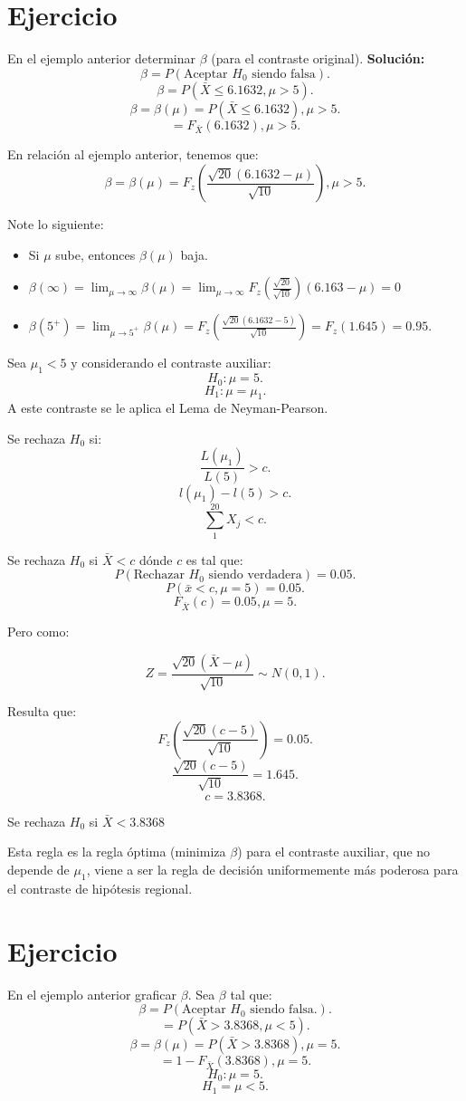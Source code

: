 \documentclass{article}
\begin{document}
\section{Ejercicio}

En el ejemplo anterior determinar $\beta$ (para el contraste original). \textbf{Solución:}
\[\beta=P(\text{Aceptar $H_{0}$ siendo falsa}).\]
\[\beta=P(\bar{X}\leq 6.1632, \mu > 5).\]
\[\beta=\beta(\mu)=P(\bar{X} \leq 6.1632), \mu>5.\]
\[=F_{\bar{X}}(6.1632),\mu>5.\]

En relación al ejemplo anterior, tenemos que:
\[\beta=\beta(\mu)=F_{z}(\frac{\sqrt{20}(6.1632-\mu)}{\sqrt{10}}),\mu>5.\]

Note lo siguiente:

\begin{itemize}
	\item Si $\mu$ sube, entonces $\beta(\mu)$ baja.
	\item $\beta(\infty)=\lim_{\mu \rightarrow \infty}\beta(\mu)=\lim_{\mu \rightarrow \infty} F_{z}(\frac{\sqrt{20}}{\sqrt{10}})(6.163-\mu)=0$
	\item $\beta(5^{+}) = \lim_{\mu \rightarrow 5^{+}} \beta(\mu) = F_{z}(\frac{\sqrt{20}(6.1632-5)}{\sqrt{10}})=F_{z}(1.645)=0.95$.
\end{itemize}

Sea $\mu_{1}<5$ y considerando el contraste auxiliar:
\[H_{0}: \mu=5.\]
\[H_{1}: \mu=\mu_{1}.\]
A este contraste se le aplica el Lema de Neyman-Pearson.

Se rechaza $H_{0}$ si:
\[\frac{L(\mu_{1})}{L(5)}>c.\]
\[l(\mu_{1})-l(5)>c.\]
\[\sum^{20}_{1}X_{j} < c.\]

Se rechaza $H_{0}$ si $\bar{X} < c$ dónde $c$ es tal que:
\[P(\text{Rechazar $H_{0}$ siendo verdadera})=0.05.\]
\[P(\bar{x}<c, \mu=5)=0.05.\]
\[F_{\bar{X}}(c)=0.05, \mu=5.\]

Pero como:

\[Z=\frac{\sqrt{20}(\bar{X}-\mu)}{\sqrt{10}}\sim N(0,1).\]

Resulta que:
\[F_{z}(\frac{\sqrt{20}(c-5)}{\sqrt{10}})=0.05.\]
\[\frac{\sqrt{20}(c-5)}{\sqrt{10}}=1.645.\]
\[c=3.8368.\]

Se rechaza $H_{0}$ si $\bar{X}< 3.8368$

Esta regla es la regla óptima (minimiza $\beta$) para el contraste auxiliar, que no depende de $\mu_{1}$, viene a ser la regla de decisión uniformemente más poderosa para el contraste de hipótesis regional.

\section{Ejercicio}
En el ejemplo anterior graficar $\beta$. Sea $\beta$ tal que:
\[\beta=P(\text{Aceptar $H_{0}$ siendo falsa.}).\]
\[=P(\bar{X}>3.8368, \mu<5).\]
\[\beta=\beta(\mu)=P(\bar{X}>3.8368),\mu=5.\]
\[=1-F_{\bar{X}}(3.8368),\mu=5.\]
\[H_{0}: \mu=5.\]
\[H_{1}=\mu<5.\]
\end{document}
